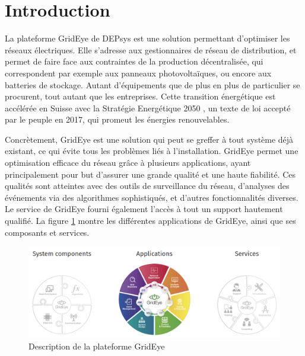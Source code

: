 \documentclass[paper=a4, fontsize=11pt]{scrartcl}
\begin{document}
\renewcommand{\contentsname}{Table des matières}
\tableofcontents

\newpage
{}
\section{Introduction}

La plateforme GridEye de DEPsys \cite{noauthor_depsys_nodate} est une solution permettant d'optimiser les réseaux électriques. Elle s'adresse aux gestionnaires de réseau de distribution, et permet de faire face aux contraintes de la production décentralisée, qui correspondent par exemple aux panneaux photovoltaïques, ou encore aux batteries de stockage. Autant d'équipements que de plus en plus de particulier se procurent, tout autant que les entreprises. Cette transition énergétique est accélérée en Suisse avec la \og Stratégie Energétique 2050 \fg \cite{noauthor_detec_nodate}, un texte de loi accepté par le peuple en 2017, qui promeut les énergies renouvelables.

Concrètement, GridEye est une solution qui peut se greffer à tout système déjà existant, ce qui évite tous les problèmes liés à l'installation. GridEye permet une optimisation efficace du réseau grâce à plusieurs applications, ayant principalement pour but d'assurer une grande qualité et une haute fiabilité. Ces qualités sont atteintes avec des outils de surveillance du réseau, d'analyses des événements via des algorithmes sophistiqués, et d'autres fonctionnalités diverses. Le service de GridEye fourni également l'accès à tout un support hautement qualifié. La figure \ref{f-GridEyeDescription} montre les différentes applications de GridEye, ainsi que ses composants et services.

\begin{figure}[H]
    \centering
    \includegraphics[width=18cm]{img/screenshots/GridEye.png}
    \caption{Description de la plateforme GridEye \cite{noauthor_depsys_nodate}}
    \label{f-GridEyeDescription}
\end{figure}
\end{document}
